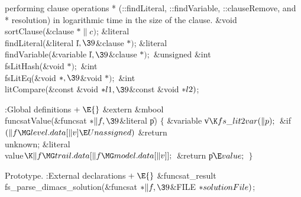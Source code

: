 {{{{{{performing clause operations  * (::findLiteral, ::findVariable, ::clauseRemove,
and  * resolution) in logarithmic time in the size of the clause.  }\6
\&{void} \\{sortClause}(\&{clause} ${}{*}\|c){}$;\6
\&{literal} \\{findLiteral}(\&{literal} \|l${},\39{}$\&{clause} ${}{*}){}$;\6
\&{literal} \\{findVariable}(\&{variable} \|l${},\39{}$\&{clause} ${}{*});{}$\6
\&{unsigned} \&{int} \\{fsLitHash}(\&{void} ${}{*});{}$\6
\&{int} \\{fsLitEq}(\&{void} ${}{*},\39{}$\&{void} ${}{*});{}$\6
\&{int} \\{litCompare}(\&{const} \&{void} ${}{*}\\{l1},\39{}$\&{const} \&{void}
${}{*}\\{l2}){}$;\par
\fi


\Y\B\4:Global definitions\X${}\mathrel+\E{}$\6
\&{extern} \&{mbool} \\{funcsatValue}(\&{funcsat} ${}{*}\|f,\39{}$\&{literal} %
\|p)\1\1\2\2\6
${}\{{}$\1\6
\&{variable} \|v${}\K\\{fs\_lit2var}(\|p);{}$\7
\&{if} ${}(\|f\MG\\{level}.\\{data}[\|v]\E\\{Unassigned}){}$\1\5
\&{return} \\{unknown};\2\7
\&{literal} \\{value}${}\K\|f\MG\\{trail}.\\{data}[\|f\MG\\{model}.\\{data}[%
\|v]];{}$\7
\&{return} \|p${}\E\\{value};{}$\6
\4${}\}{}$\2\par
\fi

Prototype.
\Y\B\4:External declarations\X${}\mathrel+\E{}$\6
\&{funcsat\_result} \\{fs\_parse\_dimacs\_solution}(\&{funcsat} ${}{*}\|f,%
\39{}$\&{FILE} ${}{*}\\{solutionFile}){}$;\par
\fi

}}}}}
